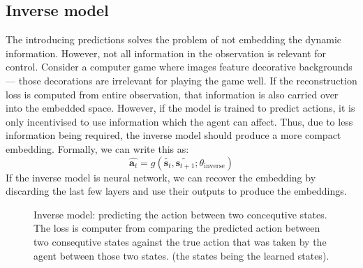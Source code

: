\subsection{Inverse model}
The introducing predictions solves the problem of not embedding the dynamic
information.
However, not all information in the observation is relevant for control.
Consider a computer game where images feature decorative backgrounds ---
those decorations are irrelevant for playing the game well.
If the reconstruction loss is computed from entire observation,
that information is also carried over into the embedded space.
However, if the model is trained to predict actions,
it is only incentivised to use information which the agent can affect.
Thus, due to less information being required,
the inverse model should produce a more compact embedding.
Formally, we can write this as:
\begin{equation}
		\hat{\bm{a}_{t}} = g (\tilde{\bm{s}_{t}}, \tilde{\bm{s}_{t+1}}; \theta_{ \text{inverse} })
\end{equation}
If the inverse model is neural network, we can recover the embedding by discarding
the last few layers and use their outputs to produce the embeddings.

\begin{figure}[htpb]
\begin{center}
\end{center}
		\caption{Inverse model: predicting the action between two concequtive states.
				The loss is computer from comparing the predicted action between two consequtive states
				against the true action that
				was taken by the agent between those two states.
				(the states being the learned states).
				}
\end{figure}

